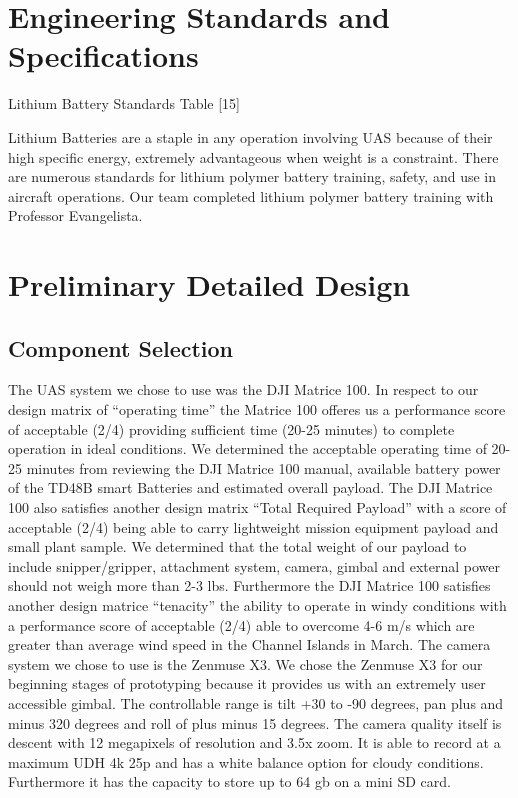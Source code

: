 \documentclass{wrcecapstone}
\begin{document}
\section{Engineering Standards and Specifications}

\begin{table}
\caption{Lithium Battery Standards Table [15]}
\end{table}

Lithium Batteries are a staple in any operation involving UAS because of their high specific energy, extremely advantageous when weight is a constraint. There are numerous standards for lithium polymer battery training, safety, and use in aircraft operations. Our team completed lithium polymer battery training with Professor Evangelista.






\section{Preliminary Detailed Design}
\subsection{Component Selection}
The UAS system we chose to use was the DJI Matrice 100. In respect to our design matrix of “operating time” the Matrice 100 offeres us a performance score of acceptable (2/4) providing sufficient time (20-25 minutes) to complete operation in ideal conditions.  We determined the acceptable operating time of 20-25 minutes from reviewing the DJI Matrice 100 manual, available battery power of the TD48B smart Batteries and estimated overall payload. The DJI Matrice 100 also satisfies another design matrix “Total Required Payload” with a score of acceptable (2/4) being able to carry lightweight mission equipment payload and small plant sample. We determined that the total weight of our payload to include snipper/gripper, attachment system, camera, gimbal and external power should not weigh more than 2-3 lbs. Furthermore the DJI Matrice 100 satisfies another design matrice “tenacity” the ability to operate in windy conditions with a performance score of acceptable (2/4) able to overcome 4-6 m/s which are greater than average wind speed in the Channel Islands in March.  The camera system we chose to use is the Zenmuse X3. We chose the Zenmuse X3 for our beginning stages of prototyping because it provides us with an extremely user accessible gimbal. The controllable range is tilt +30 to -90 degrees, pan plus and minus 320 degrees and roll of plus minus 15 degrees. The camera quality itself is descent with 12 megapixels of resolution and 3.5x zoom. It is able to record at a maximum UDH 4k 25p and has a white balance option for cloudy conditions. Furthermore it has the capacity to store up to 64 gb on a mini SD card. 
        
\end{document}
